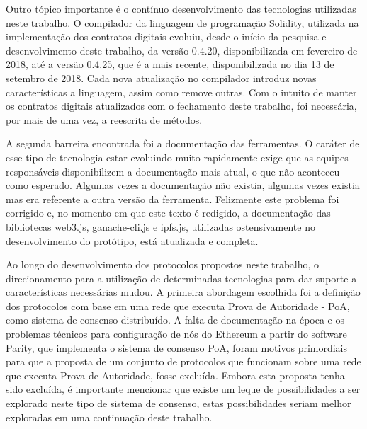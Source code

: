 \documentclass[tcc,capa]{texufpel}
\begin{document}
    Outro tópico importante é o contínuo desenvolvimento das tecnologias utilizadas neste trabalho. O compilador da linguagem de programação Solidity, utilizada na implementação dos contratos digitais evoluiu, desde o início da pesquisa e desenvolvimento deste trabalho, da versão 0.4.20, disponibilizada em fevereiro de 2018, até a versão 0.4.25, que é a mais recente, disponibilizada no dia 13 de setembro de 2018. Cada nova atualização no compilador introduz novas características a linguagem, assim como remove outras. Com o intuito de manter os contratos digitais atualizados com o fechamento deste trabalho, foi necessária, por mais de uma vez, a reescrita de métodos.
    
    A segunda barreira encontrada foi a documentação das ferramentas. O caráter de esse tipo de tecnologia estar evoluindo muito rapidamente exige que as equipes responsáveis disponibilizem a documentação mais atual, o que não aconteceu como esperado. Algumas vezes a documentação não existia, algumas vezes existia mas era referente a outra versão da ferramenta. Felizmente este problema foi corrigido e, no momento em que este texto é redigido, a documentação das bibliotecas web3.js, ganache-cli.js e ipfs.js, utilizadas ostensivamente no desenvolvimento do protótipo, está atualizada e completa.
    
    Ao longo do desenvolvimento dos protocolos propostos neste trabalho, o direcionamento para a utilização de determinadas tecnologias para dar suporte a características necessárias mudou. A primeira abordagem escolhida foi a definição dos protocolos com base em uma rede que executa Prova de Autoridade - PoA, como sistema de consenso distribuído. A falta de documentação na época e os problemas técnicos para configuração de nós do Ethereum a partir do software Parity, que implementa o sistema de consenso PoA, foram motivos primordiais para que a proposta de um conjunto de protocolos que funcionam sobre uma rede que executa Prova de Autoridade, fosse excluída. Embora esta proposta tenha sido excluída, é importante mencionar que existe um leque de possibilidades a ser explorado neste tipo de sistema de consenso, estas possibilidades seriam melhor exploradas em uma continuação deste trabalho.
    
\end{document}
